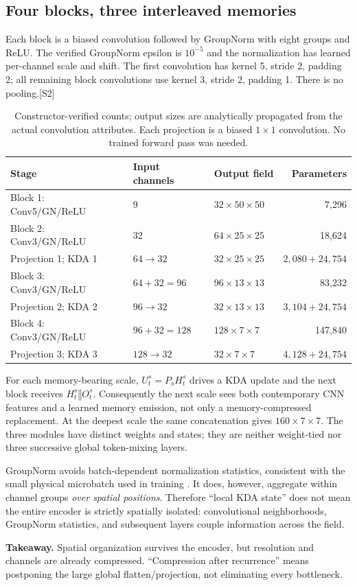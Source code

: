 \documentclass[10pt,letterpaper]{article}
\newcommand{\cat}{\mathbin\Vert}
\newcommand{\src}[1]{\textcolor{accent}{\textsf{[#1]}}}
\newcommand{\takeaway}[1]{\par\smallskip\noindent\textbf{Takeaway.} #1}
\begin{document}
\subsection{Four blocks, three interleaved memories}
Each block is a biased convolution followed by GroupNorm with eight groups and ReLU. The verified GroupNorm epsilon is $10^{-5}$ and the normalization has learned per-channel scale and shift. The first convolution has kernel 5, stride 2, padding 2; all remaining block convolutions use kernel 3, stride 2, padding 1. There is no pooling.\src{S2}\par
\begin{table}[h!]
\centering\small
\begin{tabular}{@{}lllr@{}}\toprule
Stage & Input channels & Output field & Parameters\\\midrule
Block 1: Conv5/GN/ReLU & 9 & $32\times50\times50$ & 7,296\\
Block 2: Conv3/GN/ReLU & 32 & $64\times25\times25$ & 18,624\\
Projection 1; KDA 1 & $64\to32$ & $32\times25\times25$ & $2,080+24,754$\\
Block 3: Conv3/GN/ReLU & $64+32=96$ & $96\times13\times13$ & 83,232\\
Projection 2; KDA 2 & $96\to32$ & $32\times13\times13$ & $3,104+24,754$\\
Block 4: Conv3/GN/ReLU & $96+32=128$ & $128\times7\times7$ & 147,840\\
Projection 3; KDA 3 & $128\to32$ & $32\times7\times7$ & $4,128+24,754$\\\bottomrule
\end{tabular}
\caption{Constructor-verified counts; output sizes are analytically propagated from the actual convolution attributes. Each projection is a biased $1\times1$ convolution. No trained forward pass was needed.}
\end{table}
For each memory-bearing scale, $U_t^s=P_sH_t^s$ drives a KDA update and the next block receives $H_t^s\cat O_t^s$. Consequently the next scale sees both contemporary CNN features and a learned memory emission, not only a memory-compressed replacement. At the deepest scale the same concatenation gives $160\times7\times7$. The three modules have distinct weights and states; they are neither weight-tied nor three successive global token-mixing layers.

GroupNorm avoids batch-dependent normalization statistics, consistent with the small physical microbatch used in training \cite{gn}. It does, however, aggregate within channel groups \emph{over spatial positions}. Therefore ``local KDA state'' does not mean the entire encoder is strictly spatially isolated: convolutional neighborhoods, GroupNorm statistics, and subsequent layers couple information across the field.
\takeaway{Spatial organization survives the encoder, but resolution and channels are already compressed. ``Compression after recurrence'' means postponing the large global flatten/projection, not eliminating every bottleneck.}
\end{document}
